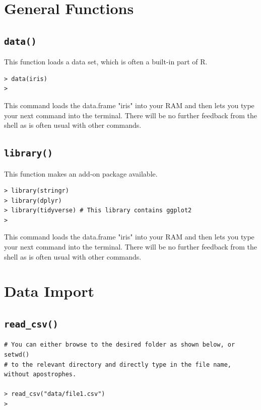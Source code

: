 \documentclass[10pt,a4paper]{article}
\begin{document}

\section{General Functions}

\subsection*{\texttt{data()}}

This function loads a data set, which is often a built-in part of R.

 \vspace{.5em}

\begin{lstlisting}
> data(iris)
>
\end{lstlisting}
 This command loads the data.frame "iris" into your RAM and then lets you type your next command into the terminal. There will be no further feedback from the shell as is often usual with other commands.

\subsection*{\texttt{library()}}

This function makes an add-on package available.

 \vspace{.5em}

\begin{lstlisting}
> library(stringr)
> library(dplyr)
> library(tidyverse) # This library contains ggplot2
>
\end{lstlisting}
 This command loads the data.frame "iris" into your RAM and then lets you type your next command into the terminal. There will be no further feedback from the shell as is often usual with other commands.
 
 \vspace{1em}

\section{Data Import}

\subsection*{\texttt{read\_csv()}}

\begin{lstlisting}
# You can either browse to the desired folder as shown below, or setwd()
# to the relevant directory and directly type in the file name, without apostrophes.

> read_csv("data/file1.csv")
> 
\end{lstlisting}
\end{document}

